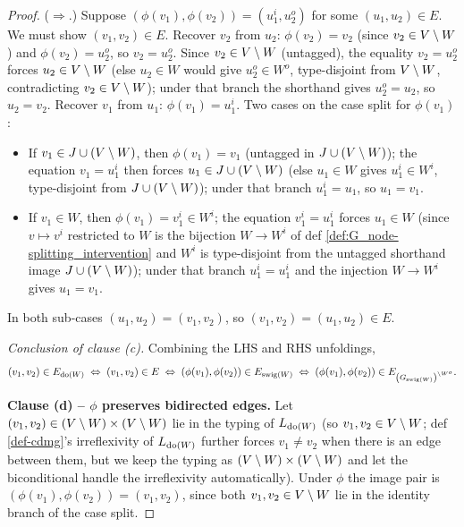 \documentclass[main]{subfiles}
\begin{document}
\begin{proof}
\smallskip\noindent($\Rightarrow$.) Suppose $(\phi(v_1), \phi(v_2)) = (u_1^i, u_2^o)$ for some $(u_1, u_2) \in E$. We must show $(v_1, v_2) \in E$. Recover $v_2$ from $u_2$: $\phi(v_2) = v_2$ (since $v_2 \in V \setminus W$) and $\phi(v_2) = u_2^o$, so $v_2 = u_2^o$. Since $v_2 \in V \setminus W$ (untagged), the equality $v_2 = u_2^o$ forces $u_2 \in V \setminus W$ (else $u_2 \in W$ would give $u_2^o \in W^o$, type-disjoint from $V \setminus W$, contradicting $v_2 \in V \setminus W$); under that branch the shorthand gives $u_2^o = u_2$, so $u_2 = v_2$. Recover $v_1$ from $u_1$: $\phi(v_1) = u_1^i$. Two cases on the case split for $\phi(v_1)$:
\begin{itemize}
    \item If $v_1 \in J \cup (V \setminus W)$, then $\phi(v_1) = v_1$ (untagged in $J \cup (V \setminus W)$); the equation $v_1 = u_1^i$ then forces $u_1 \in J \cup (V \setminus W)$ (else $u_1 \in W$ gives $u_1^i \in W^i$, type-disjoint from $J \cup (V \setminus W)$); under that branch $u_1^i = u_1$, so $u_1 = v_1$.
    \item If $v_1 \in W$, then $\phi(v_1) = v_1^i \in W^i$; the equation $v_1^i = u_1^i$ forces $u_1 \in W$ (since $v \mapsto v^i$ restricted to $W$ is the bijection $W \to W^i$ of def \ref{def:G_node-splitting_intervention} and $W^i$ is type-disjoint from the untagged shorthand image $J \cup (V \setminus W)$); under that branch $u_1^i = u_1^i$ and the injection $W \to W^i$ gives $u_1 = v_1$.
\end{itemize}
In both sub-cases $(u_1, u_2) = (v_1, v_2)$, so $(v_1, v_2) = (u_1, u_2) \in E$.

\smallskip\noindent\emph{Conclusion of clause (c).} Combining the LHS and RHS unfoldings,
\[
    (v_1, v_2) \in E_{\operatorname{do}(W)}
        \;\Leftrightarrow\; (v_1, v_2) \in E
        \;\Leftrightarrow\; (\phi(v_1), \phi(v_2)) \in E_{\mathrm{swig}(W)}
        \;\Leftrightarrow\; (\phi(v_1), \phi(v_2)) \in E_{\left ( G_{\mathrm{swig}(W)} \right )^{\setminus W^o}}.
\]
\checkmark

\medskip\noindent\textbf{Clause (d) -- $\phi$ preserves bidirected edges.}
Let $(v_1, v_2) \in (V \setminus W) \times (V \setminus W)$ lie in the typing of $L_{\operatorname{do}(W)}$ (so $v_1, v_2 \in V \setminus W$; def \ref{def-cdmg}'s irreflexivity of $L_{\operatorname{do}(W)}$ further forces $v_1 \neq v_2$ when there is an edge between them, but we keep the typing as $(V \setminus W) \times (V \setminus W)$ and let the biconditional handle the irreflexivity automatically). Under $\phi$ the image pair is $(\phi(v_1), \phi(v_2)) = (v_1, v_2)$, since both $v_1, v_2 \in V \setminus W$ lie in the identity branch of the case split.


\end{proof}
\end{document}
